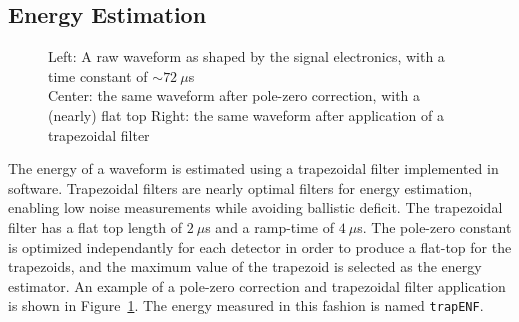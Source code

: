 \documentclass[/main.tex]{subfiles}
\begin{document}
\subsection{Energy Estimation}
\begin{figure}
  \centering
  \caption[Pole-zero correction and trapezoidal filter]{\label{fig:trapfilter}
    Left: A raw waveform as shaped by the signal electronics, with a time constant of ${\sim}72~\mu$s\\
    Center: the same waveform after pole-zero correction, with a (nearly) flat top
    Right: the same waveform after application of a trapezoidal filter
  }
\end{figure}
The energy of a waveform is estimated using a trapezoidal filter implemented in software.
Trapezoidal filters are nearly optimal filters for energy estimation, enabling low noise measurements while avoiding ballistic deficit\cite{Radeka1972, knoll}.
The trapezoidal filter has a flat top length of $2~\mu$s and a ramp-time of $4~\mu$s.
The pole-zero constant is optimized independantly for each detector in order to produce a flat-top for the trapezoids, and the maximum value of the trapezoid is selected as the energy estimator.
An example of a pole-zero correction and trapezoidal filter application is shown in Figure~\ref{fig:trapfilter}.
The energy measured in this fashion is named \texttt{trapENF}.
\end{document}
